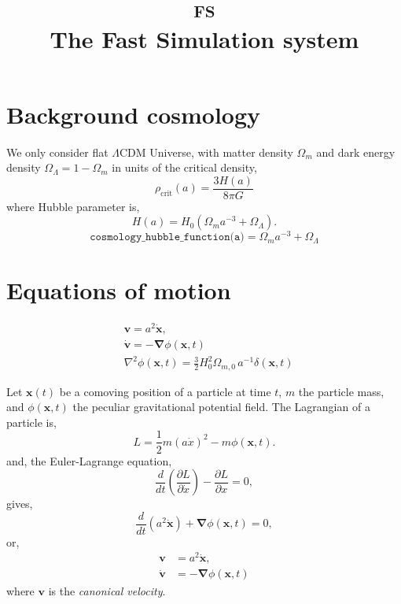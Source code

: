 \documentclass[a4paper]{article}
\title{\textsc{fs}\\The Fast Simulation system}
\date{}
\begin{document}
\maketitle

\tableofcontents
\clearpage

\section{Background cosmology}

We only consider flat $\Lambda$CDM Universe, with matter density
$\Omega_m$ and dark energy density $\Omega_\Lambda = 1 - \Omega_m$ in units of the critical density,
\begin{equation}
  \rho_\mathrm{crit}(a) = \frac{3H(a)}{8\pi G}
\end{equation}
where Hubble parameter is,
\begin{equation}
  H(a) = H_0 \left( \Omega_m a^{-3} + \Omega_\Lambda \right).
\end{equation}
%
\begin{equation}
  \texttt{cosmology\_hubble\_function(a)} = \Omega_m a^{-3} + \Omega_\Lambda
\end{equation}

\section{Equations of motion}

\begin{align}
  &\bm{v} = a^2 \dot{\bm{x}},\\
  &\dot{\bm{v}} = - \bm{\nabla} \phi(\bm{x}, t)\\
  &\nabla^2 \phi(\bm{x}, t) =
  \frac{3}{2} H_0^2 \Omega_{m,0} \, a^{-1} \delta(\bm{x}, t)
\end{align}

Let $\bm{x}(t)$ be a comoving position of a particle at time $t$, $m$
the particle mass, and $\phi(\bm{x}, t)$ the peculiar gravitational
potential field. The Lagrangian of a particle is,
\begin{equation}
  L= \frac{1}{2} m (a\dot{x})^2 - m \phi(\bm{x}, t).
\end{equation}
and, the Euler-Lagrange equation,
\begin{equation}
  \frac{d}{dt} \left( \frac{\partial L}{\partial \dot{x}} \right)
  - \frac{\partial L}{\partial x} = 0,
\end{equation}
gives,
\begin{equation}
  \label{eq:motion}
  \frac{d}{dt}(a^2 \dot{\bm{x}}) + \bm{\nabla} \phi(\bm{x}, t) = 0,
\end{equation}
or,
\begin{align}
  \bm{v} &= a^2 \dot{\bm{x}},\\
  \dot{\bm{v}} &= - \bm{\nabla} \phi(\bm{x}, t)
\end{align}
where $\bm{v}$ is the \textit{canonical velocity}. \\
\end{document}
